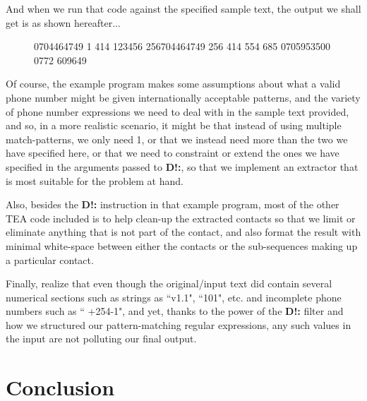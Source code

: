 \documentclass[a4paper, 18pt]{book} %
\begin{document}
And when we run that code against the specified sample text, the output we shall get is as shown hereafter...


\begin{figure}[H]
  \centering
  \begin{tcolorbox}[title=Sample Text Containing Phone Contacts,  breakable,listing options={basicstyle=\ttfamily, breaklines=true, breakatwhitespace=true}]
0704464749 1 414 123456 256704464749 256 414 554 685 0705953500 0772 609649
  \end{tcolorbox}
\end{figure}

Of course, the example program makes some assumptions about what a valid phone number might be given internationally acceptable patterns, and the variety of phone number expressions we need to deal with in the sample text provided, and so, in a more realistic scenario, it might be that instead of using multiple match-patterns, we only need 1, or that we instead need more than the two we have specified here, or that we need to constraint or extend the ones we have specified in the arguments passed to \textbf{D!:}, so that we implement an extractor that is most suitable for the problem at hand.

\vspace{1em}


Also, besides the \textbf{D!:} instruction in that example program, most of the other TEA code included is to help clean-up the extracted contacts so that we limit or eliminate anything that is not part of the contact, and also format the result with minimal white-space between either the contacts or the sub-sequences making up a particular contact.

\vspace{1em}

Finally, realize that even though the original/input text did contain several numerical sections such as strings as ``v1.1", ``101", etc. and incomplete phone numbers such as `` +254-1", and yet, thanks to the power of the \textbf{D!:} filter and how we structured our pattern-matching regular expressions, any such values in the input are not polluting our final output.



\chapter{Conclusion}
\label{SECCONC}
\end{document}

